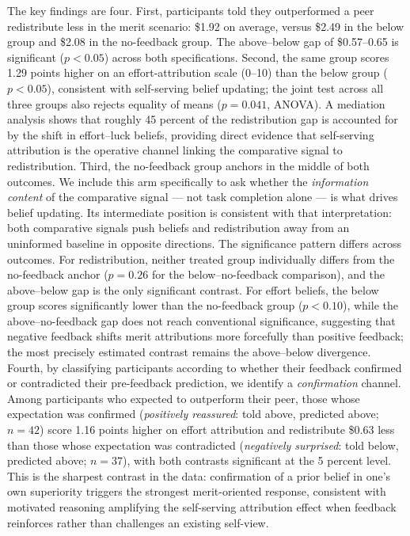 \documentclass[12pt]{article}
\begin{document}
The key findings are four.
First, participants told they outperformed a peer redistribute less in the
merit scenario: \$1.92 on average, versus \$2.49 in the below group and
\$2.08 in the no-feedback group.
The above--below gap of \$0.57--0.65 is significant ($p < 0.05$)
across both specifications.
Second, the same group scores 1.29 points higher on an effort-attribution
scale (0--10) than the below group ($p < 0.05$), consistent with
self-serving belief updating; the joint test across all three groups also
rejects equality of means ($p = 0.041$, ANOVA).
A mediation analysis shows that roughly 45 percent of the redistribution
gap is accounted for by the shift in effort--luck beliefs, providing
direct evidence that self-serving attribution is the operative channel
linking the comparative signal to redistribution.
Third, the no-feedback group anchors in the middle of both outcomes.
We include this arm specifically to ask whether the \emph{information
content} of the comparative signal --- not task completion alone --- is
what drives belief updating.
Its intermediate position is consistent with that interpretation: both
comparative signals push beliefs and redistribution away from an
uninformed baseline in opposite directions.
The significance pattern differs across outcomes.
For redistribution, neither treated group individually differs from the
no-feedback anchor ($p = 0.26$ for the below--no-feedback comparison), and
the above--below gap is the only significant contrast.
For effort beliefs, the below group scores significantly lower than the
no-feedback group ($p < 0.10$), while the above--no-feedback gap does not
reach conventional significance, suggesting that negative feedback shifts
merit attributions more forcefully than positive feedback; the most
precisely estimated contrast remains the above--below divergence.
Fourth, by classifying participants according to whether their feedback
confirmed or contradicted their pre-feedback prediction, we identify a
\emph{confirmation} channel.
Among participants who expected to outperform their peer, those whose
expectation was confirmed (\emph{positively reassured}: told above, predicted
above; $n = 42$) score 1.16 points higher on effort attribution and
redistribute \$0.63 less than those whose expectation was contradicted
(\emph{negatively surprised}: told below, predicted above; $n = 37$),
with both contrasts significant at the 5 percent level.
This is the sharpest contrast in the data: confirmation of a prior
belief in one's own superiority triggers the strongest merit-oriented
response, consistent with motivated reasoning amplifying the self-serving
attribution effect when feedback reinforces rather than challenges an
existing self-view.
\end{document}

